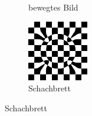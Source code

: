 \begin{figure}[ht]
\begin{subfigure}{0.32\linewidth}
    \caption{bewegtes Bild}
  \end{subfigure}
  \hfill
  \begin{subfigure}{0.32\linewidth}
    \centering
    \includegraphics[width=\linewidth]{images/A4_checkerboard.png}
    \caption{Schachbrett}
  \end{subfigure}
\end{figure}
\clearpage



